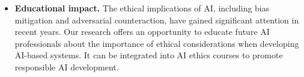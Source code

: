\begin{itemize}


	

	
	\item \textbf{Educational impact.} The ethical implications of AI, including bias mitigation and adversarial counteraction, have gained significant attention in recent years. Our research offers an opportunity to educate future AI professionals about the importance of ethical considerations when developing AI-based systems. It can be integrated into AI ethics courses to promote responsible AI development. %
	

\end{itemize}
